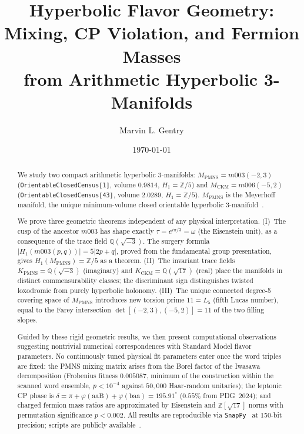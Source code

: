\documentclass[11pt,a4paper]{article}
\theoremstyle{definition}
\theoremstyle{remark}
\newcommand{\ZZ}{\mathbb{Z}}
\newcommand{\QQ}{\mathbb{Q}}
\newcommand{\Zfive}{\mathbb{Z}/5}
\newcommand{\MPMNS}{M_{\mathrm{PMNS}}}
\newcommand{\MCKM}{M_{\mathrm{CKM}}}
\newcommand{\KPMNS}{K_{\mathrm{PMNS}}}
\newcommand{\KCKM}{K_{\mathrm{CKM}}}
\begin{document}
\title{Hyperbolic Flavor Geometry:\\
Mixing, CP Violation, and Fermion Masses\\
from Arithmetic Hyperbolic 3-Manifolds}

\author[1]{Marvin L. Gentry}
\date{\today}
\maketitle

\begin{abstract}
We study two compact arithmetic hyperbolic 3-manifolds:
$\MPMNS = m003(-2,3)$ (\texttt{OrientableClosedCensus[1]},
volume $0.9814$, $H_1=\Zfive$) and
$\MCKM = m006(-5,2)$ (\texttt{OrientableClosedCensus[43]},
volume $2.0289$, $H_1=\Zfive$).
$\MPMNS$ is the Meyerhoff manifold, the unique minimum-volume
closed orientable hyperbolic 3-manifold~\cite{GMM}.

We prove three geometric theorems independent of any physical
interpretation.
(I)~The cusp of the ancestor $m003$ has shape exactly
$\tau = e^{i\pi/3} = \omega$ (the Eisenstein unit), as a
consequence of the trace field $\QQ(\sqrt{-3})$.
The surgery formula $|H_1(m003(p,q))| = 5|2p+q|$,
proved from the fundamental group presentation, gives
$H_1(\MPMNS) = \ZZ/5$ as a theorem.
(II)~The invariant trace fields $\KPMNS = \QQ(\sqrt{-3})$
(imaginary) and $\KCKM = \QQ(\sqrt{17})$ (real) place the
manifolds in distinct commensurability classes; the discriminant
sign distinguishes twisted loxodromic from purely hyperbolic
holonomy.
(III)~The unique connected degree-5 covering space of $\MPMNS$
introduces new torsion prime $11 = L_5$
(fifth Lucas number), equal to the Farey intersection
$\det[(-2,3),(-5,2)] = 11$ of the two filling slopes.

Guided by these rigid geometric results, we then present
computational observations suggesting nontrivial numerical
correspondences with Standard Model flavor parameters.
No continuously tuned physical fit parameters enter once the
word triples are fixed:
the PMNS mixing matrix arises from the Borel factor of the
Iwasawa decomposition (Frobenius fitness $0.005087$, minimum of
the construction within the scanned word ensemble, $p<10^{-4}$
against $50{,}000$ Haar-random unitaries);
the leptonic CP phase is $\delta = \pi + \varphi(\mathrm{aaB})
+ \varphi(\mathrm{baa}) = 195.91^\circ$ ($0.55\%$ from PDG~2024);
and charged fermion mass ratios are approximated by Eisenstein and
$\ZZ[\sqrt{17}]$ norms with permutation significance $p<0.002$.
All results are reproducible via \texttt{SnapPy}~\cite{SnapPy}
at 150-bit precision; scripts are publicly available~\cite{GitHub}.
\end{abstract}
\end{document}
